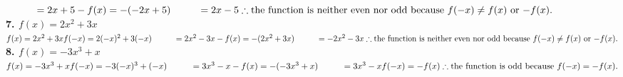 \documentclass[14pt, a4paper]{extarticle}
\begin{document}
\begin{adjustwidth}{1cm}{0pt}
\begin{math}
        \phantom{f(-x) } = 2x + 5 \\
        -f(x) = -(-2x + 5) \\
        \phantom{-f(x) } = 2x - 5 \\
        \therefore \text{the function is neither even nor odd because $f(-x) \neq f(x)$ or $-f(x)$.} \\
    \end{math}
    \\
    \textbf{7. $f(x) = 2x^2 + 3x$} \\
    \begin{math}
        f(x) = 2x^2 + 3x \\
        f(-x) = 2(-x)^2 + 3(-x) \\
        \phantom{f(-x) } = 2x^2 - 3x \\
        -f(x) = -(2x^2 + 3x) \\
        \phantom{-f(x) } = -2x^2 - 3x \\
        \therefore \text{the function is neither even nor odd because $f(-x) \neq f(x)$ or $-f(x)$.} \\
    \end{math}
    \\
    \textbf{8. $f(x) = -3x^3 + x$} \\
    \begin{math}
        f(x) = -3x^3 + x \\
        f(-x) = -3(-x)^3 + (-x) \\
        \phantom{f(-x) } = 3x^3 - x \\
        -f(x) = -(-3x^3 + x) \\
        \phantom{-f(x) } = 3x^3 - x \\
        f(-x) = -f(x) \\
        \therefore \text{the function is odd because $f(-x) = -f(x)$.} \\
    \end{math}



\end{adjustwidth}
\end{document}
